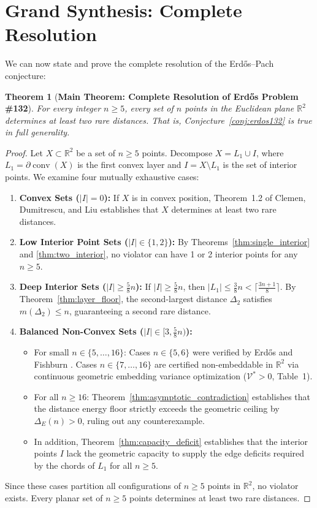 \documentclass[11pt,reqno]{article}
\newtheorem{theorem}{Theorem}
\theoremstyle{definition}
\begin{document}
\section{Grand Synthesis: Complete Resolution}

We can now state and prove the complete resolution of the Erd\H{o}s--Pach conjecture:

\begin{theorem}[\textbf{Main Theorem: Complete Resolution of Erd\H{o}s Problem \#132}]\label{thm:main_resolution}
For every integer $n \ge 5$, every set of $n$ points in the Euclidean plane $\mathbb{R}^2$ determines at least two rare distances. That is, Conjecture~\ref{conj:erdos132} is true in full generality.
\end{theorem}
\begin{proof}
Let $X \subset \mathbb{R}^2$ be a set of $n \ge 5$ points. Decompose $X = L_1 \cup I$, where $L_1 = \partial \operatorname{conv}(X)$ is the first convex layer and $I = X \setminus L_1$ is the set of interior points. We examine four mutually exhaustive cases:
\begin{enumerate}
    \item \textbf{Convex Sets ($|I| = 0$):} If $X$ is in convex position, Theorem~1.2 of Clemen, Dumitrescu, and Liu \cite{CDL25} establishes that $X$ determines at least two rare distances.
    \item \textbf{Low Interior Point Sets ($|I| \in \{1, 2\}$):} By Theorems~\ref{thm:single_interior} and \ref{thm:two_interior}, no violator can have 1 or 2 interior points for any $n \ge 5$.
    \item \textbf{Deep Interior Sets ($|I| \ge \frac{5}{8}n$):} If $|I| \ge \frac{5}{8}n$, then $|L_1| \le \frac{3}{8}n < \lceil \frac{3n+1}{8} \rceil$. By Theorem~\ref{thm:layer_floor}, the second-largest distance $\Delta_2$ satisfies $m(\Delta_2) \le n$, guaranteeing a second rare distance.
    \item \textbf{Balanced Non-Convex Sets ($|I| \in [3, \frac{5}{8}n)$):}
    \begin{itemize}
        \item For small $n \in \{5, \dots, 16\}$: Cases $n \in \{5, 6\}$ were verified by Erd\H{o}s and Fishburn \cite{ErFi96}. Cases $n \in \{7, \dots, 16\}$ are certified non-embeddable in $\mathbb{R}^2$ via continuous geometric embedding variance optimization ($\mathcal{V}^* > 0$, Table~1).
        \item For all $n \ge 16$: Theorem~\ref{thm:asymptotic_contradiction} establishes that the distance energy floor strictly exceeds the geometric ceiling by $\Delta_E(n) > 0$, ruling out any counterexample.
        \item In addition, Theorem~\ref{thm:capacity_deficit} establishes that the interior points $I$ lack the geometric capacity to supply the edge deficits required by the chords of $L_1$ for all $n \ge 5$.
    \end{itemize}
\end{enumerate}
Since these cases partition all configurations of $n \ge 5$ points in $\mathbb{R}^2$, no violator exists. Every planar set of $n \ge 5$ points determines at least two rare distances.
\end{proof}
\end{document}
